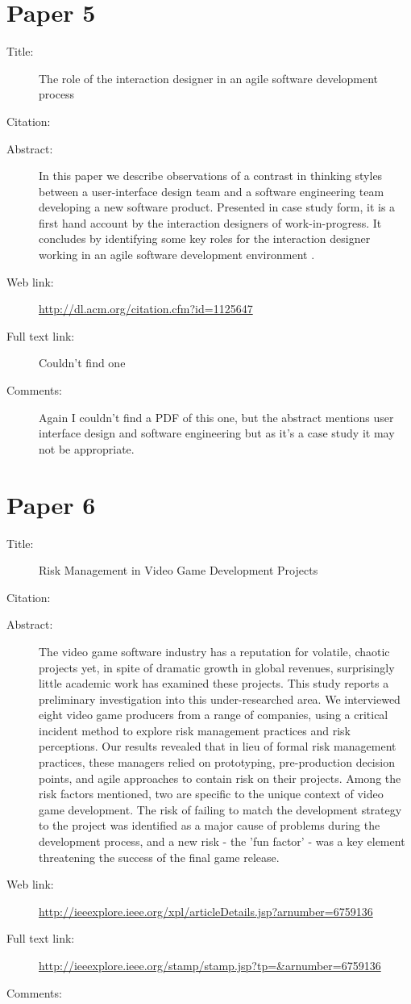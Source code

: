 \documentclass{scrartcl}
\begin{document}
\section*{Paper 5}
\begin{description}
	\item[Title:] The role of the interaction designer in an agile software development process
	\item[Citation:] \cite{Lievesley}
	\item[Abstract:] In this paper we describe observations of a contrast in thinking styles between a user-interface design team and a software engineering team developing a new software product. Presented in case study form, it is a first hand account by the interaction designers of work-in-progress. It concludes by identifying some key roles for the interaction designer working in an agile software development environment .
	\item[Web link:] \url{http://dl.acm.org/citation.cfm?id=1125647}
	\item[Full text link:] Couldn't find one
	\item[Comments:]  Again I couldn't find a PDF of this one, but the abstract mentions user interface design and software engineering but as it's a case study it may not be appropriate.
\end{description}


\section*{Paper 6}
\begin{description}
	\item[Title:] 	Risk Management in Video Game Development Projects	
	\item[Citation:] \cite{Schmalz}
	\item[Abstract:] The video game software industry has a reputation for volatile, chaotic projects yet, in spite of dramatic growth in global revenues, surprisingly little academic work has examined these projects. This study reports a preliminary investigation into this under-researched area. We interviewed eight video game producers from a range of companies, using a critical incident method to explore risk management practices and risk perceptions. Our results revealed that in lieu of formal risk management practices, these managers relied on prototyping, pre-production decision points, and agile approaches to contain risk on their projects. Among the risk factors mentioned, two are specific to the unique context of video game development. The risk of failing to match the development strategy to the project was identified as a major cause of problems during the development process, and a new risk - the 'fun factor' - was a key element threatening the success of the final game release.
	\item[Web link:] \url{http://ieeexplore.ieee.org/xpl/articleDetails.jsp?arnumber=6759136}
	\item[Full text link:] \url{http://ieeexplore.ieee.org/stamp/stamp.jsp?tp=&arnumber=6759136}
	\item[Comments:]  
\end{description}




\end{document}
